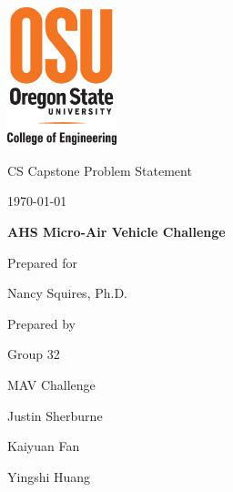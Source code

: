 \documentclass[onecolumn, draftclsnofoot,10pt, compsoc]{IEEEtran}
\def \CapstoneTeamName{		MAV Challenge}
\def \CapstoneTeamNumber{		32}
\def \GroupMemberOne{			Justin Sherburne}
\def \GroupMemberTwo{			Kaiyuan Fan}
\def \GroupMemberThree{			Yingshi Huang}
\def \CapstoneProjectName{		AHS Micro-Air Vehicle Challenge}
\def \CapstoneSponsorPerson{		Nancy Squires, Ph.D.}
\def \DocType{		Problem Statement
				}
\newcommand{\NameSigPair}[1]{\par
\makebox[2.75in][r]{#1} \hfil 	\makebox[3.25in]{\makebox[2.25in]{\hrulefill} \hfill		\makebox[.75in]{\hrulefill}}
\par\vspace{-12pt} \textit{\tiny\noindent
\makebox[2.75in]{} \hfil		\makebox[3.25in]{\makebox[2.25in][r]{Signature} \hfill	\makebox[.75in][r]{Date}}}}
\renewcommand{\NameSigPair}[1]{#1}
\begin{document}
\begin{titlepage}
    \begin{singlespace}
    	\includegraphics[height=4cm]{coe_v_spot1}
        \hfill 
        \par\vspace{.2in}
        \centering
        \scshape{
            \huge CS Capstone \DocType \par
            {\large\today}\par
            \vspace{8pt}
            \textbf{\Huge\CapstoneProjectName}\par
			\vspace{1.5in}
            {\large Prepared for}\par
            {\Large\NameSigPair{\CapstoneSponsorPerson}\par}
			\vspace{3pt}
            {\large Prepared by }\par
            Group\CapstoneTeamNumber\par
            \CapstoneTeamName\par 
            \vspace{8pt}
            {\Large
                \NameSigPair{\GroupMemberOne}\par
                \NameSigPair{\GroupMemberTwo}\par
                \NameSigPair{\GroupMemberThree}\par
            }
            \vspace{.5in}
        }
        \begin{abstract}

\end{abstract}
\end{singlespace}
\end{titlepage}
\end{document}
